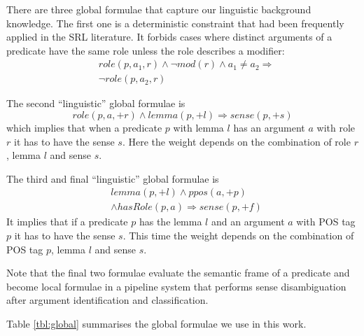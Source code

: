 There are three global formulae that capture our linguistic background knowledge. The first one is a deterministic constraint that had been frequently applied in the SRL literature. It forbids cases where distinct arguments of a predicate have the same role unless the role describes a modifier:
\begin{eqnarray*}
 &role\left(p,a_{1},r\right)\wedge \neg mod\left(r\right)\wedge a_{1}\neq a_{2}  \Rightarrow\\
  & \neg role\left(p,a_{2},r\right)
\end{eqnarray*}

The second ``linguistic'' global formulae is
\[
role(p,a,+r) \wedge lemma(p,+l) \Rightarrow sense(p,+s) 
\]
which implies that when a predicate $p$ with lemma $l$ has an argument $a$ with role $r$ it has to have the sense $s$. Here the weight depends on the combination of role $r$, lemma $l$ and sense $s$.

The third and final ``linguistic'' global formulae is
\begin{eqnarray*}
  & lemma(p,+l) \wedge ppos(a,+p)  \\
  & \wedge hasRole(p,a)  \Rightarrow sense(p,+f) 
\end{eqnarray*}
It implies that if a predicate $p$ has the lemma $l$ and an argument $a$ with POS tag $p$ it has to have the sense $s$. This time the weight depends on the combination of POS tag $p$, lemma $l$ and sense $s$.

Note that the final two formulae evaluate the semantic frame of a predicate and become local formulae in a pipeline system that performs sense disambiguation after argument identification and classification.

Table \ref{tbl:global} summarises the global formulae we use in this work. 

